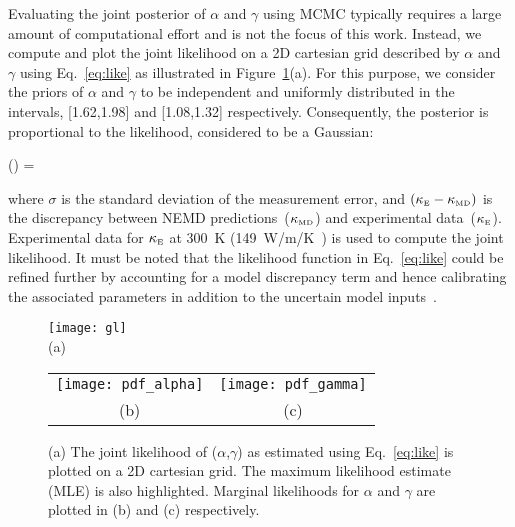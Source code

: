 Evaluating the joint posterior of $\alpha$ and $\gamma$ using MCMC typically requires a large amount of
computational effort and is not the focus of this work. Instead, we compute and plot the joint likelihood on
a 2D cartesian grid described by $\alpha$ and $\gamma$ using Eq.~\ref{eq:like} as illustrated in
Figure~\ref{fig:like}(a). For this purpose, we consider the priors of $\alpha$ and $\gamma$ to be
independent and uniformly distributed in the intervals, [1.62,1.98] and [1.08,1.32] respectively. 
Consequently, the posterior is proportional to the likelihood, considered to be a Gaussian:

\be
{}(\vert{}) = \exp{}
\label{eq:like}
\ee

\noindent where $\sigma$ is the standard deviation of the measurement error, and
$(\kappa_{\tiny{\mbox{E}}} - \kappa_{\tiny{\mbox{MD}}})$ is the discrepancy between 
NEMD predictions~($\kappa_{\tiny{\mbox{MD}}}$)
and experimental data~($\kappa_{\tiny{\mbox{E}}}$). Experimental data for $\kappa_{\tiny{\mbox{E}}}$ at 300~K
(149~W/m/K~\cite{Shanks:1963}) is used to compute the joint likelihood. It must be noted that the likelihood
function in Eq.~\ref{eq:like} could be refined further by accounting for a model discrepancy term and hence
calibrating the associated parameters in addition to the uncertain model inputs~\cite{Kennedy:2001,Ling:2014}. 

\begin{figure}[htbp]
 \begin{center}
  \texttt{[image: gl]}
  \\ (a)
  \begin{tabular}{cc}
  \texttt{[image: pdf\_alpha]}
  &
  \texttt{[image: pdf\_gamma]}
  \\ (b) & (c)
  \end{tabular}
\caption{(a) The joint likelihood of ($\alpha$,$\gamma$) as estimated using Eq.~\ref{eq:like} is plotted
on a 2D cartesian grid. The maximum likelihood estimate (MLE) is also highlighted.
Marginal likelihoods for $\alpha$ and $\gamma$ are plotted in (b) and (c) respectively.}
\label{fig:like}
\end{center}
\end{figure}

